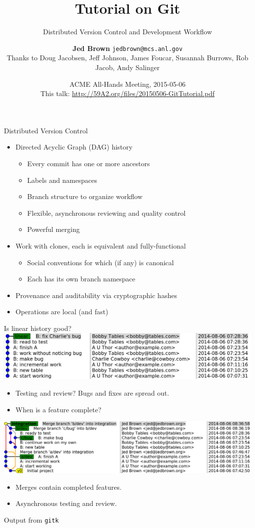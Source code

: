 \documentclass{beamer}
\title{Tutorial on Git}
\subtitle{Distributed Version Control and Development Workflow}
\author{{\bf Jed Brown} \texttt{jedbrown@mcs.anl.gov} \\
\quad Thanks to Doug Jacobsen, Jeff Johnson, James Foucar, Susannah Burrows, Rob Jacob, Andy Salinger}
\date{ACME All-Hands Meeting, 2015-05-06 \\[1em]
This talk: \url{http://59A2.org/files/20150506-GitTutorial.pdf}}
\begin{document}
\lstset{language=C}
\normalem

\begin{frame}
  \titlepage
\end{frame}

\begin{frame}{Distributed Version Control}
  \begin{itemize}
  \item Directed Acyclic Graph (DAG) history
    \begin{itemize}
    \item Every commit has one or more ancestors
    \item Labels and namespaces
    \item Branch structure to organize workflow
    \item Flexible, asynchronous reviewing and quality control
    \item Powerful merging
    \end{itemize}
  \item Work with clones, each is equivalent and fully-functional
    \begin{itemize}
    \item Social conventions for which (if any) is canonical
    \item Each has its own branch namespace
    \end{itemize}
  \item Provenance and auditability via cryptographic hashes
  \item Operations are local (and fast)
  \end{itemize}
\end{frame}

\begin{frame}{Is linear history good?}
  \includegraphics[width=\textwidth]{figures/Git/history-linear.png}
  \begin{itemize}
  \item Testing and review?  Bugs and fixes are spread out.
  \item When is a feature complete?
  \end{itemize}
  \includegraphics[width=\textwidth]{figures/Git/history-branch.png}
  \begin{itemize}
  \item Merges contain completed features.
  \item Asynchronous testing and review.
  \end{itemize}
  {\small Output from \texttt{gitk}}
\end{frame}
\end{document}
